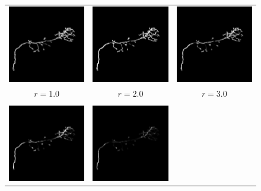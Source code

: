 \documentclass{InsightArticle}
\begin{document}
\begin{figure}[t]
  \centering
  \begin{tabular}{ccc}
    \includegraphics[width=0.31\columnwidth]{OP_1_01_max_scale_space_tubularity.png} &
    \includegraphics[width=0.31\columnwidth]{OP_1_03_max_scale_space_tubularity.png} &
    \includegraphics[width=0.31\columnwidth]{OP_1_05_max_scale_space_tubularity.png} \\
    $r = 1.0$ & $r = 2.0$ & $r = 3.0$ \\ \\
    \includegraphics[width=0.31\columnwidth]{OP_1_07_max_scale_space_tubularity.png} &
    \includegraphics[width=0.31\columnwidth]{OP_1_09_max_scale_space_tubularity.png} &

\end{tabular}
\end{figure}
\end{document}
